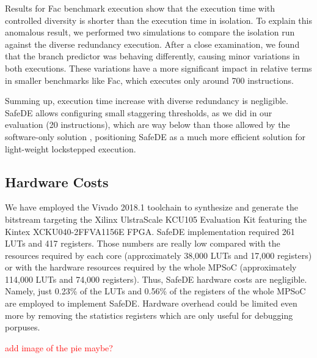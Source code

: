 Results for Fac benchmark execution show that the execution time with controlled diversity is shorter than the execution time in isolation. To explain this anomalous result, we performed two simulations to compare the isolation run against the diverse redundancy execution. After a close examination, we found that the branch predictor was behaving differently, causing minor variations in both executions. These variations have a more significant impact in relative terms in smaller benchmarks like Fac, which executes only around 700 instructions. 

Summing up, execution time increase with diverse redundancy is negligible. SafeDE allows configuring small staggering thresholds, as we did in our evaluation (20 instructions), which are way below than those allowed by the software-only solution \cite{alcaide2020software}, positioning SafeDE as a much more efficient solution for light-weight lockstepped execution. 


\bigskip

\subsection{Hardware Costs}
\label{section:Hardware_resources}

We have employed the Vivado 2018.1 toolchain to synthesize and generate the bitstream targeting the Xilinx UlstraScale KCU105 Evaluation Kit featuring the Kintex XCKU040-2FFVA1156E FPGA. SafeDE implementation required 261 LUTs and 417 registers. Those numbers are really low compared with the resources required by each core (approximately 38,000 LUTs and 17,000 registers) or with the hardware resources required by the whole MPSoC (approximately 114,000 LUTs and 74,000 registers). Thus, SafeDE hardware costs are negligible. Namely, just 0.23\% of the LUTs and 0.56\% of the registers of the whole MPSoC are employed to implement SafeDE. Hardware overhead could be limited even more by removing the statistics registers which are only useful for debugging porpuses.

\textcolor{red}{add image of the pie maybe?}
\bigskip


